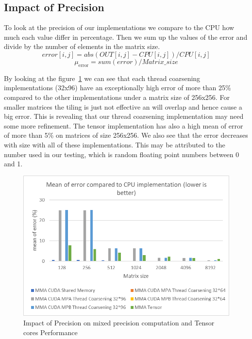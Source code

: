 \documentclass[conference]{IEEEtran}
\begin{document}
  
  \subsection{Impact of Precision}\label{sec:impact-precision}
  
  To look at the precision of our implementations we compare to the CPU how much each value differ in percentage.
  Then we sum up the values of the error and divide by the number of elements in the matrix size.
  \[error[i,j] = abs(OUT[i,j] - CPU[i,j]) / CPU[i,j] \]
  \[\mu_{\mathrm{error}} = sum(error)/Matrix\_size\]

  By looking at the figure~\ref{fig:precision-impact} we can see that each thread coarsening implementations (32x96)
  have an exceptionally high error of more than 25\% compared to the other implementations under a matrix size of 256x256.
  For smaller matrices the tiling is just not effective an will overlap and hence cause a big error. This is revealing that 
  our thread coarsening implementation may need some more refinement. The tensor implementation has also a high mean of error of
  more than 5\% on matrices of size 256x256.
  We also see that the error decreases with size with all of these implementations.
  This may be attributed to the number used in our testing, which is random floating point numbers between 0 and 1. 
  \begin{figure}[htbp]
    \centering
    \includegraphics[scale=0.6]{figures/Mean of error compared to CPU3.png}
    \caption{Impact of Precision on mixed precision computation and Tensor cores Performance}
    \label{fig:precision-impact}
  \end{figure}
\end{document}
